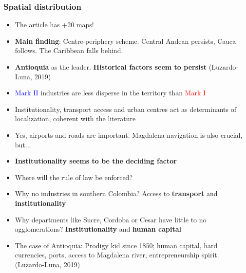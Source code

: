 \documentclass{beamer}
\begin{document}
	\begin{frame}[allowframebreaks]
		\frametitle{Spatial distribution}
		\begin{itemize}
			\item The article has +20 maps!
			\item \textbf{Main finding}: Centre-periphery scheme. Central Andean persists, Cauca follows. The Caribbean falls behind.
			\item \textbf{Antioquia} as the leader. \textbf{Historical factors seem to persist} (Luzardo-Luna, 2019)
			\item \textcolor{blue}{Mark II} industries are less disperse in the territory than \textcolor{red}{Mark I}
			\item Institutionality, transport access and urban centres act as determinants of localization, coherent with the literature
			\item Yes, airports and roads are important. Magdalena navigation is also crucial, but...
			\framebreak
			\item \textbf{Institutionality seems to be the deciding factor}
			\item Where will the rule of law be enforced?
			\item Why no industries in southern Colombia? Access to \textbf{transport} and \textbf{institutionality}
			\item Why departments like Sucre, Cordoba or Cesar have little to no agglomerations? \textbf{Institutionality} and \textbf{human capital}
			\item The case of Antioquia: Prodigy kid since 1850; human capital, hard currencies, ports, access to Magdalena river, entrepreneurship spirit. (Luzardo-Luna, 2019)
		\end{itemize}
	\end{frame}
\end{document}
